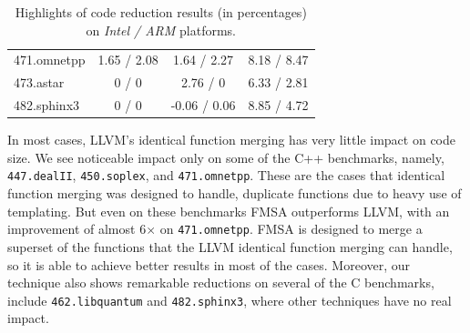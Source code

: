 \begin{table}[]
{\begin{tabular}{lccc}
471.omnetpp                               & 1.65 / 2.08        & 1.64 / 2.27   & 8.18 / 8.47             \\
\rowcolor{evencolor} 473.astar                                 & 0 / 0              & 2.76 / 0      & 6.33 / 2.81             \\
482.sphinx3                               & 0 / 0              & -0.06 / 0.06  & 8.85 / 4.72             \\
\bottomrule
\end{tabular}
}
\caption{Highlights of code reduction results (in percentages) on \textit{Intel / ARM} platforms. }
\end{table}

In most cases, LLVM's identical function merging has very little impact on code size. We see noticeable impact only on some of the C++
benchmarks, namely, \texttt{447.dealII}, \texttt{450.soplex}, and \texttt{471.omnetpp}. These are the cases that identical function merging
was designed to handle, duplicate functions due to heavy use of templating. But even on these benchmarks FMSA outperforms LLVM, with an
improvement of almost 6$\times$ on \texttt{471.omnetpp}. FMSA is designed to merge a superset of the functions that the LLVM identical
function merging can handle, so it is able to achieve better results in most of the cases. Moreover, our technique also shows remarkable
reductions on several of the C benchmarks, include \texttt{462.libquantum} and \texttt{482.sphinx3}, where other techniques have no real
impact.


